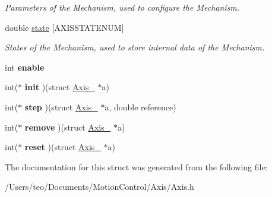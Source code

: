 \begin{DoxyCompactItemize}
\begin{DoxyCompactList}\small\item\em Parameters of the Mechanism, used to configure the Mechanism. \end{DoxyCompactList}\item 
\mbox{\label{struct_axis___a9fb32ee42123d0cdcdb2ecf104b618fa}} 
double \hyperlink{struct_axis___a9fb32ee42123d0cdcdb2ecf104b618fa}{state} \mbox{[}A\+X\+I\+S\+S\+T\+A\+T\+E\+N\+UM\mbox{]}
\begin{DoxyCompactList}\small\item\em States of the Mechanism, used to store internal data of the Mechanism. \end{DoxyCompactList}\item 
\mbox{\label{struct_axis___aa56f8ce4414ae9e02b20024df05ed361}} 
int {\bfseries enable}
\item 
\mbox{\label{struct_axis___affd9fd2e3594dc28512b3d87f7792ae0}} 
int($\ast$ {\bfseries init} )(struct \hyperlink{struct_axis__}{Axis\+\_\+} $\ast$a)
\item 
\mbox{\label{struct_axis___acf3dfc3100edfbe5fbf72e8d839d3831}} 
int($\ast$ {\bfseries step} )(struct \hyperlink{struct_axis__}{Axis\+\_\+} $\ast$a, double reference)
\item 
\mbox{\label{struct_axis___af5a371b31ca72ba6807370af5fee58ff}} 
int($\ast$ {\bfseries remove} )(struct \hyperlink{struct_axis__}{Axis\+\_\+} $\ast$a)
\item 
\mbox{\label{struct_axis___ab70d94e255d0f442913019cdce4f6d96}} 
int($\ast$ {\bfseries reset} )(struct \hyperlink{struct_axis__}{Axis\+\_\+} $\ast$a)
\end{DoxyCompactItemize}


The documentation for this struct was generated from the following file\+:\begin{DoxyCompactItemize}
\item 
/\+Users/teo/\+Documents/\+Motion\+Control/\+Axis/Axis.\+h\end{DoxyCompactItemize}
